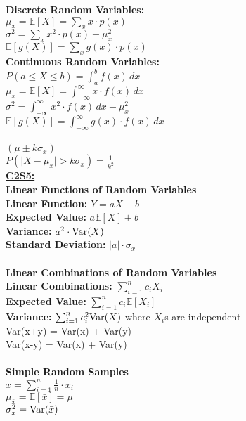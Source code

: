 \documentclass[letter, 12pt]{article}
\begin{document}
\begin{multicols}{2}
\textbf{Discrete Random Variables:}\\
\(\mu_x = \mathds{E}[X] = \sum_xx\cdot p(x)\)\\
\(\sigma^2 = \sum_xx^2\cdot p(x) - \mu_x^2\)\\
\(\mathds{E}[g(X)] = \sum_xg(x)\cdot p(x)\)\\
\textbf{Continuous Random Variables:}\\
\(P(a\leq X \leq b) = \int_a^b f(x)\,dx\)\\
\(\mu_x = \mathds{E}[X] = \int_{-\infty}^\infty x \cdot f(x)\,dx\)\\
\(\sigma^2 = \int_{-\infty}^\infty x^2\cdot f(x)\,dx - \mu_x^2 \)\\
\(\mathds{E}[g(X)] = \int_{-\infty}^\infty  g(x) \cdot f(x)\,dx\)\\
\\ \( (\mu \pm k\sigma_x)\)\\
\(P(\vert X - \mu_x \vert > k\sigma_x) = \frac{1}{k^2}\)\\
\textbf{\uline{C2S5:}}\\
\textbf{Linear Functions of Random Variables}\\
\textbf{Linear Function:} \(Y = aX + b\)\\
\textbf{Expected Value:} \( a\mathds{E}[X] + b\)\\
\textbf{Variance:} \(a^2\cdot \textnormal{Var}(X)\)\\
\textbf{Standard Deviation:} \(\vert a \vert \cdot \sigma_x\)\\	
\\ \textbf{Linear Combinations of Random Variables}\\
\textbf{Linear Combinations:} \(\sum_{i=1}^n c_iX_i\)\\
\textbf{Expected Value:} \(\sum_{i=1}^n c_i \mathds{E}[X_i]\)\\
\textbf{Variance:} \(\sum_{i=1}^n c_i^2\textnormal{Var}(X)\) where \(X_i\)s are independent\\
Var(x+y) = Var(x) + Var(y)\\
Var(x-y) = Var(x) + Var(y)\\
\\ \textbf{Simple Random Samples}\\
\(\bar{x} = \sum_{i=1}^n\frac{1}{n}\cdot x_i\)\\
\(\mu_{\bar{x}} = \mathds{E}[\bar{x}] = \mu\)\\
\(\sigma_x^2 = \textnormal{Var}(\bar{x})\)\\

\end{multicols}
\end{document}
